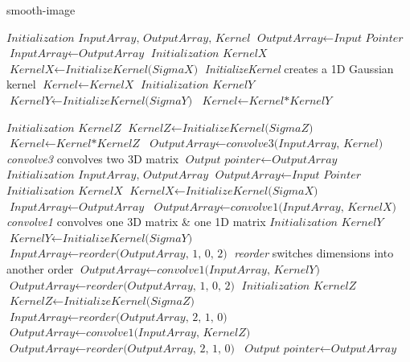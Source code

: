 \documentclass[10pt]{report}
\begin{document}
	\begin{algorithm}[H]
		\caption{smooth-image}\label{smooth-image}
		\begin{algorithmic}[1]
				\State $\textit{Initialization InputArray, OutputArray, Kernel}$
				\State $\textit{OutputArray} \gets \textit{Input Pointer}$
				\State $\textit{InputArray} \gets \textit{OutputArray}$
					\State $\textit{Initialization KernelX}$	
					\State $\textit{KernelX} \gets \textit{InitializeKernel(SigmaX)}$ \Comment  \textit{InitializeKernel} creates a 1D Gaussian kernel
					\State $\textit{Kernel} \gets \textit{KernelX}$
				\EndIf
					\State $\textit{Initialization KernelY}$	
					\State $\textit{KernelY} \gets \textit{InitializeKernel(SigmaY)}$
					\State $\textit{Kernel} \gets \textit{Kernel*KernelY}$

				\EndIf
					\State $\textit{Initialization KernelZ}$	
					\State $\textit{KernelZ} \gets \textit{InitializeKernel(SigmaZ)}$
					\State $\textit{Kernel} \gets \textit{Kernel*KernelZ}$
				\EndIf
				\State $\textit{OutputArray} \gets \textit{convolve3(InputArray, Kernel)}$ \Comment  \textit{convolve3} convolves two 3D matrix 
				\State $\textit{Output pointer} \gets \textit{OutputArray}$
			\EndProcedure
			\State $ $
				\State $\textit{Initialization InputArray, OutputArray}$
				\State $\textit{OutputArray} \gets \textit{Input Pointer}$
					\State $\textit{Initialization KernelX}$	
					\State $\textit{KernelX} \gets \textit{InitializeKernel(SigmaX)}$ 
					\State $\textit{InputArray} \gets \textit{OutputArray}$
					\State $\textit{OutputArray} \gets \textit{convolve1(InputArray, KernelX)}$ \Comment \textit{convolve1} convolves one 3D matrix  \& one 1D matrix 
				\EndIf
					\State $\textit{Initialization KernelY}$	
					\State $\textit{KernelY} \gets \textit{InitializeKernel(SigmaY)}$
					\State $\textit{InputArray} \gets \textit{reorder(OutputArray, 1, 0, 2)}$ \Comment \textit{reorder} switches dimensions into another order
					\State $\textit{OutputArray} \gets \textit{convolve1(InputArray, KernelY)}$
					\State $\textit{OutputArray} \gets \textit{reorder(OutputArray, 1, 0, 2)}$
				\EndIf
					\State $\textit{Initialization KernelZ}$	
					\State $\textit{KernelZ} \gets \textit{InitializeKernel(SigmaZ)}$
					\State $\textit{InputArray} \gets \textit{reorder(OutputArray, 2, 1, 0)}$
					\State $\textit{OutputArray} \gets \textit{convolve1(InputArray, KernelZ)}$
					\State $\textit{OutputArray} \gets \textit{reorder(OutputArray, 2, 1, 0)}$
				\EndIf
				\State $\textit{Output pointer} \gets \textit{OutputArray}$
			\EndProcedure			
		\end{algorithmic}
	\end{algorithm}
	
\end{document}

